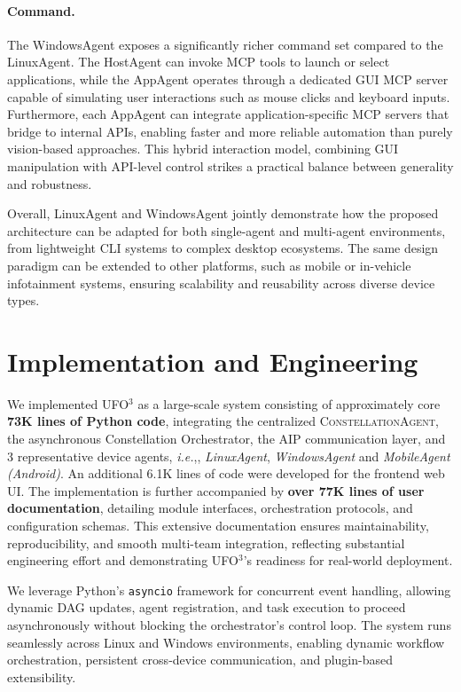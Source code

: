 \documentclass[10pt]{article} %
\newcommand{\ufo}{\textsc{UFO}$^3$\xspace}
\newcommand{\cagent}{\textsc{ConstellationAgent}\xspace}
\newcommand{\ie}{\textit{i.e.},\xspace}
\begin{document}
\paragraph{Command.} 
The WindowsAgent exposes a significantly richer command set compared to the LinuxAgent. The HostAgent can invoke MCP tools to launch or select applications, while the AppAgent operates through a dedicated GUI MCP server capable of simulating user interactions such as mouse clicks and keyboard inputs. Furthermore, each AppAgent can integrate application-specific MCP servers that bridge to internal APIs, enabling faster and more reliable automation than purely vision-based approaches. This hybrid interaction model, combining GUI manipulation with API-level control strikes a practical balance between generality and robustness.

\smallskip
Overall, LinuxAgent and WindowsAgent jointly demonstrate how the proposed architecture can be adapted for both single-agent and multi-agent environments, from lightweight CLI systems to complex desktop ecosystems. The same design paradigm can be extended to other platforms, such as mobile or in-vehicle infotainment systems, ensuring scalability and reusability across diverse device types.


\section{Implementation and Engineering}
\label{sec:implementation}

We implemented \ufo as a large-scale system consisting of approximately core \textbf{73K lines of Python code}, integrating the centralized \cagent, the asynchronous Constellation Orchestrator, the AIP communication layer, and 3 representative device agents, \ie, \textit{LinuxAgent}, \textit{WindowsAgent} and \textit{MobileAgent (Android)}. An additional 6.1K lines of code were developed for the frontend web UI. The implementation is further accompanied by \textbf{over 77K lines of user documentation}, detailing module interfaces, orchestration protocols, and configuration schemas. This extensive documentation ensures maintainability, reproducibility, and smooth multi-team integration, reflecting substantial engineering effort and demonstrating \ufo's readiness for real-world deployment.

We leverage Python's \texttt{asyncio} framework for concurrent event handling, allowing dynamic DAG updates, agent registration, and task execution to proceed asynchronously without blocking the orchestrator's control loop. The system runs seamlessly across Linux and Windows environments, enabling dynamic workflow orchestration, persistent cross-device communication, and plugin-based extensibility.
\end{document}
